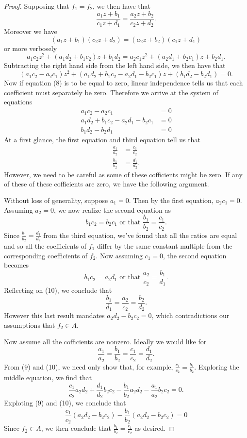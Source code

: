 \documentclass[12pt]{article}
\theoremstyle{plain}
\theoremstyle{definition}
\begin{document}
\begin{appendices}
\begin{proof}
	Supposing that $f_1 = f_2$, we then have that
	\[
		\frac{a_1z + b_1}{c_1z + d_1} = \frac{a_2 z + b_2}{c_2 z + d_2}.
	\]
	Moreover we have
	\[
		(a_1z + b_1)(c_2z + d_2) = (a_2z + b_2)(c_1z + d_1)
	\]
	or more verbosely 
	\[
		 a_1c_2z^2 + (a_1d_2 + b_1c_2)z + b_1d_2 = a_2c_1z^2 + (a_2d_1 + b_2c_1)z + b_2d_1.
	\]
	Subtracting the right hand side from the left hand side, we then have that
	\begin{equation}
		(a_1c_2 - a_2c_1)z^2 + (a_1d_2 + b_1c_2 - a_2d_1 - b_2c_1)z + (b_1d_2 - b_2d_1) = 0.	
	\end{equation}
	Now if equation (8) is to be equal to zero, linear independence tells us that each coefficient must separately be zero. Therefore we arrive at the system of equations
	\begin{align*}
		a_1c_2 - a_2c_1 & = 0\\
		a_1d_2 + b_1c_2 - a_2d_1 - b_2c_1 & = 0\\
		b_1d_2 - b_2d_1 & = 0
	\end{align*}
	At a first glance, the first equation and third equation tell us that 
	\begin{align}
		\frac{a_1}{a_2} & = \frac{c_1}{c_2}\\
		\frac{b_1}{b_2} & = \frac{d_1}{d_2}.
	\end{align} 
	However, we need to be careful as some of these cofficients might be zero. If any of these of these cofficients are zero, we have the following argument. 
	
	Without loss of generality, suppose	 $a_1 = 0$. Then by the first equation, $a_2c_1 = 0$. Assuming $a_2 = 0$, we now realize the second equation as 
	\[
		b_1c_2 = b_2c_1 \text{ or that } \frac{b_1}{b_2} = \frac{c_1}{c_2}.
	\]
	Since $\frac{b_1}{b_2} = \frac{d_1}{d_2}$ from the third equation, we've found that all the ratios are equal and so all the coefficients of $f_1$ differ by the same constant multiple from the corresponding coefficients of $f_2$. Now assuming $c_1 = 0$, the second equation becomes
	\[
		b_1c_2 = a_2d_1 \text{ or that } \frac{a_2}{c_2} = \frac{b_1}{d_1}.
	\]
	Reflecting on (10), we conclude that 
	\[
		\frac{b_1}{d_1} = \frac{a_2}{c_2} = \frac{b_2}{d_2}.
	\]
	However this last result mandates $a_2d_2 - b_2c_2 = 0$, which contradictions our assumptions that $f_2\in A$.
	
	Now assume all the cofficients are nonzero. Ideally we would like for 
	\[
		\frac{a_1}{a_2} = \frac{b_1}{b_2} = \frac{c_1}{c_2} = \frac{d_1}{d_2}.
	\] 
	From (9) and (10), we need only show that, for example, $\frac{c_1}{c_2} = \frac{b_1}{b_2}$.	Exploring the middle equation, we find that
	\[
		\frac{c_1}{c_2}a_2d_2 + \frac{d_1}{d_2}b_2c_2 - \frac{b_1}{b_2}a_2d_2 - \frac{a_1}{a_2}b_2c_2 = 0.
	\]
	Exploting (9) and (10), we conclude that
	\[
		\frac{c_1}{c_2}(a_2d_2 - b_2c_2) - \frac{b_1}{b_2}(a_2d_2 - b_2c_2) = 0
	\]
	Since $f_2\in A$, we then conclude that $\frac{b_1}{b_2} = \frac{c_1}{c_2}$ as desired.
	

\end{proof}
\end{appendices}
\end{document}

